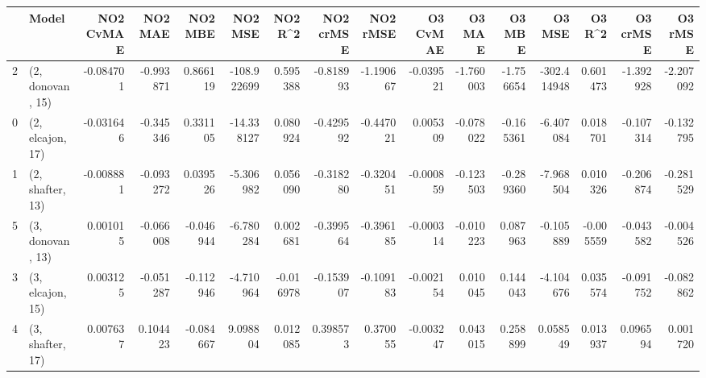 \begin{tabular}{llrrrrrrrrrrrrrr}
\toprule
{} &             Model &  NO2 CvMAE &   NO2 MAE &   NO2 MBE &     NO2 MSE &   NO2 R\textasciicircum2 &  NO2 crMSE &  NO2 rMSE &  O3 CvMAE &    O3 MAE &    O3 MBE &      O3 MSE &    O3 R\textasciicircum2 &  O3 crMSE &   O3 rMSE \\
\midrule
2 &  (2, donovan, 15) &  -0.084701 & -0.993871 &  0.866119 & -108.922699 &  0.595388 &  -0.818993 & -1.190667 & -0.039521 & -1.760003 & -1.756654 & -302.414948 &  0.601473 & -1.392928 & -2.207092 \\
0 &  (2, elcajon, 17) &  -0.031646 & -0.345346 &  0.331105 &  -14.338127 &  0.080924 &  -0.429592 & -0.447021 &  0.005309 & -0.078022 & -0.165361 &   -6.407084 &  0.018701 & -0.107314 & -0.132795 \\
1 &  (2, shafter, 13) &  -0.008881 & -0.093272 &  0.039526 &   -5.306982 &  0.056090 &  -0.318280 & -0.320451 & -0.000859 & -0.123503 & -0.289360 &   -7.968504 &  0.010326 & -0.206874 & -0.281529 \\
5 &  (3, donovan, 13) &   0.001015 & -0.066008 & -0.046944 &   -6.780284 &  0.002681 &  -0.399564 & -0.396185 & -0.000314 & -0.010223 &  0.087963 &   -0.105889 & -0.005559 & -0.043582 & -0.004526 \\
3 &  (3, elcajon, 15) &   0.003125 & -0.051287 & -0.112946 &   -4.710964 & -0.016978 &  -0.153907 & -0.109183 & -0.002154 &  0.010045 &  0.144043 &   -4.104676 &  0.035574 & -0.091752 & -0.082862 \\
4 &  (3, shafter, 17) &   0.007637 &  0.104423 & -0.084667 &    9.098804 &  0.012085 &   0.398573 &  0.370055 & -0.003247 &  0.043015 &  0.258899 &    0.058549 &  0.013937 &  0.096594 &  0.001720 \\
\bottomrule
\end{tabular}
